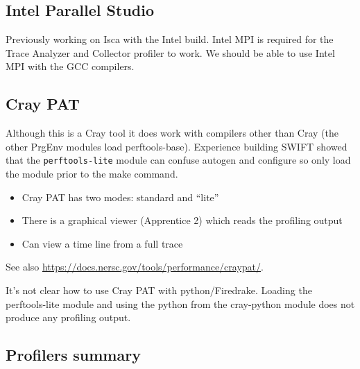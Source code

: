\documentclass[a4paper,titlepage]{article}
\begin{document}

\subsection{Intel Parallel Studio}

Previously working on Isca with the Intel build. Intel MPI is required for the Trace Analyzer and Collector profiler to work. We should be able to use Intel MPI with the GCC compilers.


\subsection{Cray PAT}

Although this is a Cray tool it does work with compilers other than Cray (the other PrgEnv modules load perftools-base). Experience building SWIFT showed that the \texttt{perftools-lite} module can confuse autogen and configure so only load the module prior to the make command. 

\begin{itemize}
\item Cray PAT has two modes: standard and ``lite''
\item There is a graphical viewer (Apprentice 2) which reads the profiling output
\item Can view a time line from a full trace
\end{itemize}
See also \url{https://docs.nersc.gov/tools/performance/craypat/}.

It's not clear how to use Cray PAT with python/Firedrake. Loading the perftools-lite module and using the python from the cray-python module does not produce any profiling output.


\subsection{Profilers summary}
\end{document}
